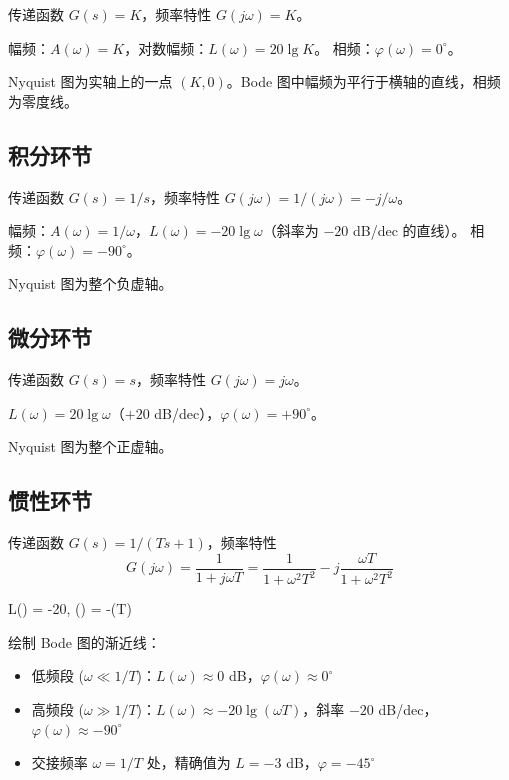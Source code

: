 传递函数 $G(s) = K$，频率特性 $G(j\omega) = K$。

幅频：$A(\omega) = K$，对数幅频：$L(\omega) = 20\lg K$。
相频：$\varphi(\omega) = 0^{\circ}$。

Nyquist 图为实轴上的一点 $(K, 0)$。Bode 图中幅频为平行于横轴的直线，相频为零度线。

\subsection{积分环节}

传递函数 $G(s) = 1/s$，频率特性 $G(j\omega) = 1/(j\omega) = -j/\omega$。

幅频：$A(\omega) = 1/\omega$，$L(\omega) = -20\lg \omega$（斜率为 $-20$ dB/dec 的直线）。
相频：$\varphi(\omega) = -90^{\circ}$。

Nyquist 图为整个负虚轴。

\subsection{微分环节}

传递函数 $G(s) = s$，频率特性 $G(j\omega) = j\omega$。

$L(\omega) = 20\lg \omega$（$+20$ dB/dec），$\varphi(\omega) = +90^{\circ}$。

Nyquist 图为整个正虚轴。

\subsection{惯性环节}

传递函数 $G(s) = 1/(Ts + 1)$，频率特性
\[
G(j\omega) = \frac{1}{1 + j\omega T} = \frac{1}{1 + \omega^2 T^2} - j\frac{\omega T}{1 + \omega^2 T^2}
\]

\begin{myformula}
L(\omega) = -20\lg{},\quad
\varphi(\omega) = -\arctan(\omega T)
\end{myformula}

绘制 Bode 图的渐近线：
\begin{itemize}
    \item 低频段 ($\omega \ll 1/T$)：$L(\omega) \approx 0$ dB，$\varphi(\omega) \approx 0^{\circ}$
    \item 高频段 ($\omega \gg 1/T$)：$L(\omega) \approx -20\lg(\omega T)$，斜率 $-20$ dB/dec，$\varphi(\omega) \approx -90^{\circ}$
    \item 交接频率 $\omega = 1/T$ 处，精确值为 $L = -3$ dB，$\varphi = -45^{\circ}$
\end{itemize}

